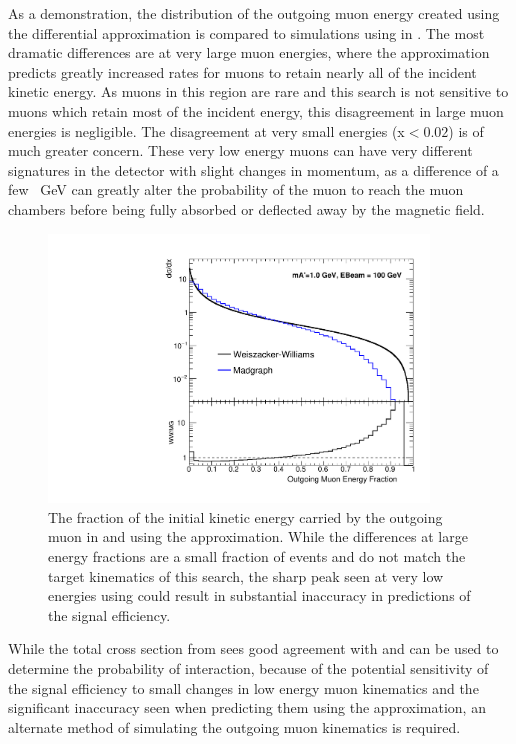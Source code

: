 As a demonstration, the distribution of the outgoing muon energy created using the differential \ww approximation is compared to simulations using \mg in . 
The most dramatic differences are at very large muon energies, where the \ww approximation predicts greatly increased rates for muons to retain nearly all of the incident kinetic energy.
As muons in this region are rare and this search is not sensitive to muons which retain most of the incident energy, this disagreement in large muon energies is negligible.
The disagreement at very small energies (x$<0.02$) is of much greater concern. 
These very low energy muons can have very different signatures in the detector with slight changes in momentum, as a difference of a few \SI{}{\giga\eV} can greatly alter the probability of the muon to reach the muon chambers before being fully absorbed or deflected away by the magnetic field.

\begin{figure}[h]
	\includegraphics[width=0.9\textwidth]{figures/wwXcomp.pdf}
	\caption[\ww and \mg Outgoing Energy]{The fraction of the initial kinetic energy carried by the outgoing muon in \mg and using the \ww approximation. While the differences at large energy fractions are a small fraction of events and do not match the target kinematics of this search, the sharp peak seen at very low energies using \ww could result in substantial inaccuracy in predictions of the signal efficiency.}
	\label{fig:wwMgComp}
\end{figure}

While the total cross section from \ww sees good agreement with \mg and can be used to determine the probability of interaction, because of the potential sensitivity of the signal efficiency to small changes in low energy muon kinematics and the significant inaccuracy seen when predicting them using the \ww approximation, an alternate method of simulating the outgoing muon kinematics is required.

